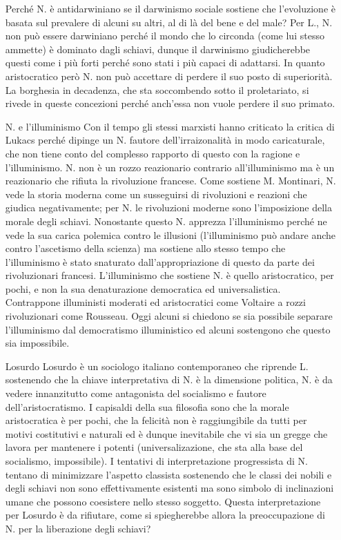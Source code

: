 \documentclass[10pt,a4paper]{article}
\begin{document}
\begin{itemize}
Perché N. è antidarwiniano se il darwinismo sociale sostiene che l'evoluzione è basata sul prevalere di alcuni su altri, al di là del bene e del male? Per L., N. non può essere darwiniano perché il mondo che lo circonda (come lui stesso ammette) è dominato dagli schiavi, dunque il darwinismo giudicherebbe questi come i più forti perché sono stati i più capaci di adattarsi. In quanto aristocratico però N. non può accettare di perdere il suo posto di superiorità. La borghesia in decadenza, che sta soccombendo sotto il proletariato, si rivede in queste concezioni perché anch'essa non vuole perdere il suo primato.
\item[N. e l'illuminismo] Con il tempo gli stessi marxisti hanno criticato la critica di Lukacs perché dipinge un N. fautore dell'irraizonalità in modo caricaturale, che non tiene conto del complesso rapporto di questo con la ragione e l'illuminismo. N. non è un rozzo reazionario contrario all'illuminismo ma è un reazionario che rifiuta la rivoluzione francese. Come sostiene M. Montinari, N. vede la storia moderna come un susseguirsi di rivoluzioni e reazioni che giudica negativamente; per N. le rivoluzioni moderne sono l'imposizione della morale degli schiavi. Nonostante questo N. apprezza l'illuminismo perché ne vede la sua carica polemica contro le illusioni (l'illuminismo può andare anche contro l'ascetismo della scienza) ma sostiene allo stesso tempo che l'illuminismo è stato snaturato dall'appropriazione di questo da parte dei rivoluzionari francesi. L'illuminismo che sostiene N. è quello aristocratico, per pochi, e non la sua denaturazione democratica ed universalistica. Contrappone illuministi moderati ed aristocratici come Voltaire a rozzi rivoluzionari come Rousseau. Oggi alcuni si chiedono se sia possibile separare l'illuminismo dal democratismo illuministico ed alcuni sostengono che questo sia impossibile. 
\item[Losurdo] Losurdo è un sociologo italiano contemporaneo che riprende L. sostenendo che la chiave interpretativa di N. è la dimensione politica, N. è da vedere innanzitutto come antagonista del socialismo e fautore dell'aristocratismo. I capisaldi della sua filosofia sono che la morale aristocratica è per pochi, che la felicità non è raggiungibile da tutti per motivi costitutivi e naturali ed è dunque inevitabile che vi sia un gregge che lavora per mantenere i potenti (universalizazione, che sta alla base del socialismo, impossibile). I tentativi di interpretazione progressista di N. tentano di minimizzare l'aspetto classista sostenendo che le classi dei nobili e degli schiavi non sono effettivamente esistenti ma sono simbolo di inclinazioni umane che possono coesistere nello stesso soggetto. Questa interpretazione per Losurdo è da rifiutare, come si spiegherebbe allora la preoccupazione di N. per la liberazione degli schiavi?

\end{itemize}
\end{document}
